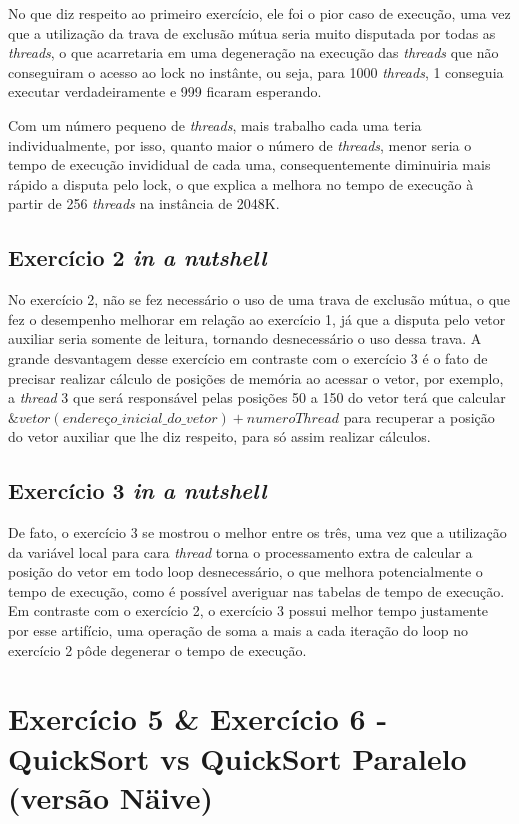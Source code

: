 \documentclass[a4paper, fontsize=12pt, parskip=half]{scrartcl}
\theoremstyle{mytheor}
\begin{document}
No que diz respeito ao primeiro exercício, ele foi o pior caso de execução, uma vez que a utilização da trava de exclusão mútua seria muito disputada por todas as \textit{threads}, o que acarretaria em uma degeneração na execução das \textit{threads} que não conseguiram o acesso ao lock no instânte, ou seja, para 1000 \textit{threads}, 1 conseguia executar verdadeiramente e 999 ficaram esperando. 

Com um número pequeno de \textit{threads}, mais trabalho cada uma teria individualmente, por isso, quanto maior o número de \textit{threads}, menor seria o tempo de execução invididual de cada uma, consequentemente diminuiria mais rápido a disputa pelo lock, o que explica a melhora no tempo de execução à partir de 256 \textit{threads} na instância de 2048K.

\subsection{Exercício 2 \textit{in a nutshell}}

No exercício 2, não se fez necessário o uso de uma trava de exclusão mútua, o que fez o desempenho melhorar em relação ao exercício 1, já que a disputa pelo vetor auxiliar seria somente de leitura, tornando desnecessário o uso dessa trava. A grande desvantagem desse exercício em contraste com o exercício 3 é o fato de precisar realizar cálculo de posições de memória ao acessar o vetor, por exemplo, a \textit{thread} 3 que será responsável pelas posições 50 a 150 do vetor terá que calcular $\&vetor (endereço\_inicial\_do\_vetor) + numeroThread$ para recuperar a posição do vetor auxiliar que lhe diz respeito, para só assim realizar cálculos.

\subsection{Exercício 3 \textit{in a nutshell}}
De fato, o exercício 3 se mostrou o melhor entre os três, uma vez que a utilização da variável local para cara \textit{thread} torna o processamento extra de calcular a posição do vetor em todo loop desnecessário, o que melhora potencialmente o tempo de execução, como é possível averiguar nas tabelas de tempo de execução. Em contraste com o exercício 2, o exercício 3 possui melhor tempo justamente por esse artifício, uma operação de soma a mais a cada iteração do loop no exercício 2 pôde degenerar o tempo de execução.

\section{Exercício 5 \& Exercício 6 - QuickSort vs QuickSort Paralelo (versão Näive)}
\end{document}
